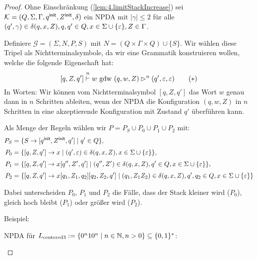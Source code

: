 \begin{proof}
 Ohne Einschränkung (\autoref{lem:4.limitStackIncrease}) sei $\mathcal{K} = (Q, \Sigma, \Gamma, q^\mathsf{init}, Z^\mathsf{init}, \delta)$ ein \ac{NPDA} mit $|\gamma| \le 2$ für alle $(q', \gamma) \in \delta(q, x, Z), q, q' \in Q, x \in \Sigma \cup \{\varepsilon\}, Z \in \Gamma$.

    Definiere $\mathcal{G} = (\Sigma, N, P, S)$ mit $N = (Q \times \Gamma \times Q) \cup \{S\}$.
    Wir wählen diese Tripel als Nichtterminalsymbole, da wir eine Grammatik konstruieren wollen, welche die folgende Eigenschaft hat:
      \begin{equation}\label{eq:npdaToCfgProp}
        [q,Z,q']\stackrel{n}{\vdash} w \text{ gdw } (q,w,Z) \rhd^n (q',\varepsilon,\varepsilon) \tag{$*$}
      \end{equation}
    In Worten: Wir können vom Nichtterminalsymbol $[q,Z,q']$ das Wort $w$ genau dann in $n$ Schritten ableiten,
    wenn der \ac{NPDA} die Konfiguration $(q,w,Z)$ in $n$ Schritten in eine akzeptierende Konfiguration mit Zustand $q'$ überführen kann.
    
    Als Menge der Regeln wählen wir $P=P_S\cup P_0\cup P_1\cup P_2$ mit:
    \begin{align*}
    P_S &= \{S \to [q^\mathsf{init}, Z^\mathsf{init}, q']\mid q'\in Q\}, \\[1mm]
    P_0 &= \{ [q, Z, q'] \to x \mid (q', \varepsilon)\in \delta(q, x, Z), x \in \Sigma \cup \{\varepsilon\} \}, \\[1mm]
    P_1 &= \{[q, Z, q'] \to x[q'', Z', q'] \mid (q'', Z')\in \delta(q, x, Z), q' \in Q, x \in \Sigma \cup \{\varepsilon\}\}, \\[1mm]
    P_2 &= \{[q, Z, q'] \to x[q_1,Z_1,q_2][q_2, Z_2, q'] \mid (q_1, Z_1Z_2)\in\delta(q, x, Z), q', q_2 \in Q, x \in \Sigma \cup \{\varepsilon\} \}
    \end{align*}
    
    Dabei unterscheiden $P_0$, $P_1$ und $P_2$ die Fälle, dass der Stack kleiner wird ($P_0$), gleich hoch bleibt ($P_1$) oder größer wird ($P_2$).
    
    Beispiel:
    
    \ac{NPDA} für $L_\text{centered3}:=\{0^n10^n \mid n\in\mathbb{N}, n > 0 \}\subseteq\{0,1\}^*$:
    
    \begin{center}
\end{center}
\end{proof}
